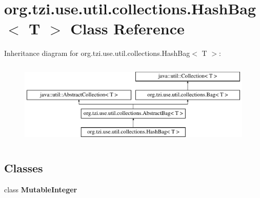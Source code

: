 \hypertarget{classorg_1_1tzi_1_1use_1_1util_1_1collections_1_1_hash_bag_3_01_t_01_4}{\section{org.\-tzi.\-use.\-util.\-collections.\-Hash\-Bag$<$ T $>$ Class Reference}
\label{classorg_1_1tzi_1_1use_1_1util_1_1collections_1_1_hash_bag_3_01_t_01_4}
}
Inheritance diagram for org.\-tzi.\-use.\-util.\-collections.\-Hash\-Bag$<$ T $>$\-:\begin{figure}[H]
\begin{center}
\leavevmode
\includegraphics[height=4.000000cm]{classorg_1_1tzi_1_1use_1_1util_1_1collections_1_1_hash_bag_3_01_t_01_4}
\end{center}
\end{figure}
\subsection*{Classes}
\begin{DoxyCompactItemize}
\item 
class {\bfseries Mutable\-Integer}
\end{DoxyCompactItemize}
